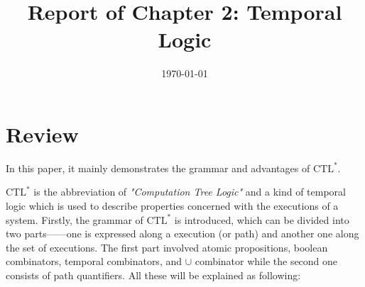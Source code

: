 \documentclass[11pt, conference]{IEEEtran}
\begin{document}
    \title{Report of Chapter 2: Temporal Logic}
    \author{}
    \date{\today}
    \maketitle

    \section{Review}
    In this paper, it mainly demonstrates the grammar and advantages of $\text{CTL}^*$.

    $\text{CTL}^*$ is the abbreviation of {\itshape "Computation Tree Logic"} and a kind of temporal logic which is used to describe properties concerned with the executions of a system.
    Firstly, the grammar of $\text{CTL}^*$ is introduced, which can be divided into two parts——one is expressed along a execution (or path) and another one along the set of executions. The first part involved atomic propositions, boolean combinators, temporal combinators, and $\cup$ combinator while the second one consists of path quantifiers. All these will be explained as following:
\end{document}
